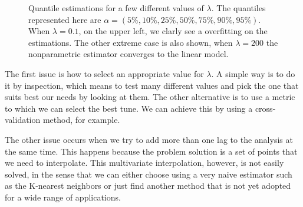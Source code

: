 \begin{figure}[htp]
\begin{minipage}[t]{0.4\linewidth}
\begin{minipage}[b]{\linewidth}
      \label{fig:npqar-cross}
     \end{minipage}
  \end{minipage}
  \caption{Quantile estimations for a few different values of $\lambda$. The quantiles represented here are $\alpha = (5\%, 10\%, 25\%, 50\%, 75\%, 90\%, 95\%)$. When $\lambda = 0.1$, on the upper left, we clarly see a overfitting on the estimations. The other extreme case is also shown, when $\lambda=200$ the nonparametric estimator converges to the linear model.}
  \label{fig:npqar-results}
\end{figure}

The first issue is how to select an appropriate value for $\lambda$. A simple way is to do it by inspection, which means to test many different values and pick the one that suits best our needs by looking at them. The other alternative is to use a metric to which we can select the best tune. We can achieve this by using a cross-validation method, for example.

The other issue occurs when we try to add more than one lag to the analysis at the same time. This happens because the problem solution is a set of points that we need to interpolate. This multivariate interpolation, however, is not easily solved, in the sense that we can either choose using a very naive estimator such as the K-nearest neighbors or just find another method that is not yet adopted for a wide range of applications.

%
%
%
%
%
%
%
%
%
%
%
%
%
